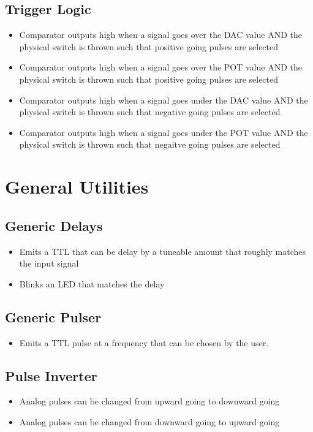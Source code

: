 \documentclass[11pt,a4paper]{article}
\begin{document}
\subsection{Trigger Logic}
\begin{itemize}


\item Comparator outputs high when a signal goes over the DAC value AND the 
physical switch is thrown such that positive going pulses are selected

\item Comparator outputs high when a signal goes over the POT value AND the 
physical switch is thrown such that positive going pulses are selected

\item Comparator outputs high when a signal goes under the DAC value AND the 
physical switch is thrown such that negative going pulses are selected

\item Comparator outputs high when a signal goes under the POT value AND the 
physical switch is thrown such that negaitve going pulses are selected
\end{itemize}
\section{General Utilities}
\subsection{Generic Delays}
\begin{itemize}
\item Emits a TTL that can be delay by a tuneable amount that roughly matches the input signal
\item Blinks an LED that matches the delay
\end{itemize}
\subsection{Generic Pulser}
\begin{itemize}
\item Emits a TTL pulse at a frequency that can be chosen by the user.
\end{itemize}
\subsection{Pulse Inverter}
\begin{itemize}
\item Analog pulses can be changed from upward going to downward going
\item Analog pulses can be changed from downward going to upward going
\end{itemize}
\end{document}
